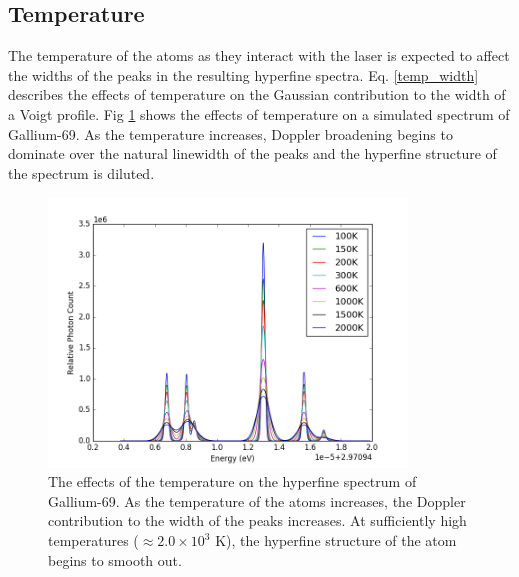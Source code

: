 \subsection{Temperature}
The temperature of the atoms as they interact with the laser is expected to affect the widths of the peaks in the resulting hyperfine spectra. Eq. \ref{temp_width} describes the effects of temperature on the Gaussian contribution to the width of a Voigt profile. Fig \ref{temp_comp} shows the effects of temperature on a simulated spectrum of Gallium-69. As the temperature increases, Doppler broadening begins to dominate over the natural linewidth of the peaks and the hyperfine structure of the spectrum is diluted. 
\begin{figure}[h!]
\begin{center}
\includegraphics[width = 0.85\textwidth]{Graphics/temp_comparison.png}
\end{center}
\caption[The effects of the temperature on the hyperfine spectrum of Gallium-69.]{\small The effects of the temperature on the hyperfine spectrum of Gallium-69. As the temperature of the atoms increases, the Doppler contribution to the width of the peaks increases. At sufficiently high temperatures ($\approx 2.0 \times 10^3$ K), the hyperfine structure of the atom begins to smooth out.}
\label{temp_comp}
\end{figure}

